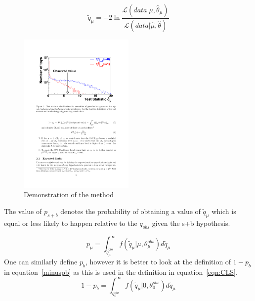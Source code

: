 
\begin{equation}
\tilde{q}_{\mu} = -2\ln\frac{\mathcal{L}\left(data|\mu,\hat{\theta}_{\mu}\right)}{\mathcal{L}\left(data|\hat{\mu},\hat{\theta}\right)}
\label{eqn:testStat}
\end{equation}

\begin{figure}[ht!]
\centering
    \includegraphics[width=0.5\textwidth]{images/Analysis/CLSdemo.pdf}
    \caption{Demonstration of the \CLS method~\cite{CMS-NOTE-2011-005}}
    \label{fig:CLSdemo}
\end{figure}

The value of $p_{s+b}$ denotes the probability of obtaining a value of $\tilde{q}_{\mu}$ which is equal or less likely to happen relative to the $q_{obs}$ given the s+b hypothesis.


\begin{equation}
p_{\mu} = \int_{\tilde{q}_{\mu}^{obs}}^{\infty} f\left(\tilde{q}_{\mu} | \mu, \theta^{obs}_{\mu}   \right) d\tilde{q}_{\mu}
\end{equation}
One can similarly define $p_{b}$, however it is better to look at the definition of $1-p_{b}$ in equation~\ref{minuspb} as this is used in the \CLS definition in equation~\ref{eqn:CLS}.
\begin{equation}
1-p_{b} = \int_{q_{0}^{obs}}^{\infty} f\left(\tilde{q}_{\mu} |0, \theta^{obs}_{0}   \right) d\tilde{q}_{\mu}
\end{equation}

